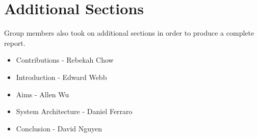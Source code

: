 \section{Additional Sections}
Group members also took on additional sections in order to produce a complete report.

\begin{itemize}
    \item Contributions - Rebekah Chow
    \item Introduction - Edward Webb
    \item Aims - Allen Wu
    \item System Architecture - Daniel Ferraro
    \item Conclusion - David Nguyen
\end{itemize}